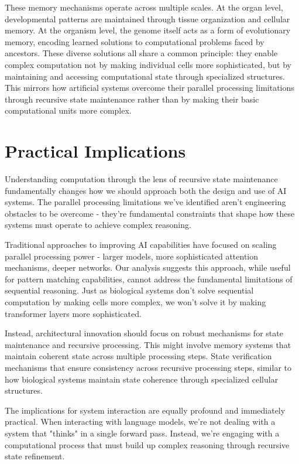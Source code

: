 \documentclass[12pt]{article}
\begin{document}
These memory mechanisms operate across multiple scales. At the organ level, developmental patterns are maintained through tissue organization and cellular memory. At the organism level, the genome itself acts as a form of evolutionary memory, encoding learned solutions to computational problems faced by ancestors. These diverse solutions all share a common principle: they enable complex computation not by making individual cells more sophisticated, but by maintaining and accessing computational state through specialized structures. This mirrors how artificial systems overcome their parallel processing limitations through recursive state maintenance rather than by making their basic computational units more complex.

\section{Practical Implications}

Understanding computation through the lens of recursive state maintenance fundamentally changes how we should approach both the design and use of AI systems. The parallel processing limitations we've identified aren't engineering obstacles to be overcome - they're fundamental constraints that shape how these systems must operate to achieve complex reasoning.

Traditional approaches to improving AI capabilities have focused on scaling parallel processing power - larger models, more sophisticated attention mechanisms, deeper networks. Our analysis suggests this approach, while useful for pattern matching capabilities, cannot address the fundamental limitations of sequential reasoning. Just as biological systems don't solve sequential computation by making cells more complex, we won't solve it by making transformer layers more sophisticated.

Instead, architectural innovation should focus on robust mechanisms for state maintenance and recursive processing. This might involve memory systems that maintain coherent state across multiple processing steps. State verification mechanisms that ensure consistency across recursive processing steps, similar to how biological systems maintain state coherence through specialized cellular structures.

The implications for system interaction are equally profound and immediately practical. When interacting with language models, we're not dealing with a system that "thinks" in a single forward pass. Instead, we're engaging with a computational process that must build up complex reasoning through recursive state refinement.
\end{document}
